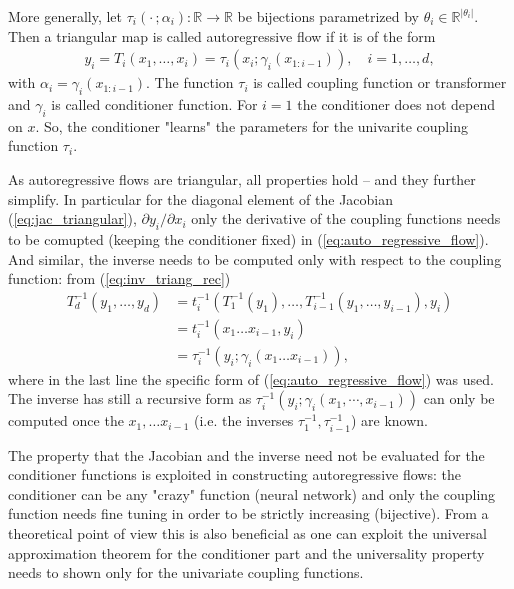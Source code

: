 \documentclass[12pt,a4paper]{article}
\begin{document}
More generally, let $\tau_i(\cdot\,; \alpha_i): \mathbb{R} \rightarrow \mathbb{R}$ be bijections parametrized by $\theta_i \in \mathbb{R}^{|\theta_{i}|}$. Then a triangular map is called autoregressive flow if it is of the form 
\begin{align} \label{eq:auto_regressive_flow}
	y_i =T_i(x_1,\dots, x_i) = \tau_i(x_i; \gamma_i(x_{1:i-1})), \quad i=1,\dots,d, 
\end{align} 
with  $\alpha_i = \gamma_i(x_{1:i-1})$. The function $\tau_i$ is called coupling function or transformer and  $\gamma_i$ is called conditioner function. For $i=1$ the conditioner does not depend on $x$.  So, the conditioner "learns" the parameters for the univarite coupling function $\tau_i$. 

As autoregressive flows are triangular, all properties hold -- and they further simplify. In particular for the diagonal element of the Jacobian (\ref{eq:jac_triangular}), $\partial y_i / \partial x_i$ only the derivative of the coupling functions needs to be comupted (keeping the conditioner fixed) in (\ref{eq:auto_regressive_flow}). And similar, the inverse needs to be computed only with respect to the coupling function: from (\ref{eq:inv_triang_rec})
\begin{align} \label{eq:auto_regressive_flow_inv}
	T_d^{-1}(y_1,\dots, y_d) 
	&= t_i^{-1}(T_1^{-1}(y_1), \dots, T_{i-1}^{-1}(y_1, \dots,y_{i-1} ), y_i) \nonumber \\ 
	&=t_i^{-1}(x_1\dots x_{i-1}, y_i) \nonumber \\
	&=\tau_i^{-1}(y_i; \gamma_i(x_1\dots x_{i-1})),
\end{align}
where in the last line the specific form of (\ref{eq:auto_regressive_flow}) was used. The inverse has still a recursive form as $\tau_i^{-1}(y_i; \gamma_i(x_1, \cdots, x_{i-1}))$ can only be computed once the $x_1, \dots x_{i-1}$ (i.e. the inverses  $\tau_1^{-1}, \tau_{i-1}^{-1}$) are known. 

The property that the Jacobian and the inverse need not be evaluated for the conditioner functions is exploited in constructing autoregressive flows: the conditioner can be any "crazy" function (neural network) and only the coupling function needs fine tuning in order to be strictly increasing (bijective). From a theoretical point of view this is also beneficial as one can exploit the universal approximation theorem for the conditioner part and the universality property needs to shown only for the univariate coupling functions. \cite{jaini_polynomial_flow_2019, wehenkel_unconstraint_monotonic_neural_networks, huang_2018_neural_autoregressive_flows}
\end{document}
